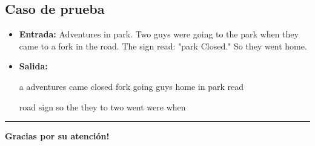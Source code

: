 \documentclass{article}
\begin{document}
\begin{flushleft}
\subsection*{Caso de prueba}
\begin{itemize}
    \item \textbf{Entrada:}\newline 
    Adventures in park.
    Two guys were going to the 
    park when they came to a fork in the
    road. The sign read: "park Closed." 
    So they went home.
    \item \textbf{Salida:} \newline
    \vspace{0.2 cm}
    \begin{minipage}[b]{.4\textwidth}
    \allowbreak
    \vspace{0.1cm}
    a \newline
    adventures \newline
    came \newline
    closed \newline
    fork \newline
    going \newline
    guys \newline
    home \newline
    in \newline
    park \newline
    read \newline
    \end{minipage}
    \begin{minipage}[b]{.4\textwidth}
    road \newline
    sign \newline
    so \newline
    the \newline
    they \newline
    to \newline
    two \newline
    went \newline
    were \newline
    when 
    \end{minipage}
\end{itemize}
\hrule 
\vspace{1cm}
\centerline{\textbf{Gracias por su atención!}}
\end{flushleft}
\end{document}
